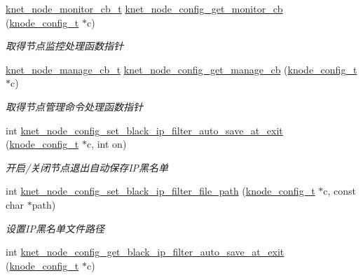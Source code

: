 \begin{DoxyCompactItemize}
\hyperlink{a00066_aabd13837697aceb20b2a2cb8908e79cd_aabd13837697aceb20b2a2cb8908e79cd}{knet\+\_\+node\+\_\+monitor\+\_\+cb\+\_\+t} \hyperlink{a00104_a95c9de27cbf0b374451dba2db035b9df_a95c9de27cbf0b374451dba2db035b9df}{knet\+\_\+node\+\_\+config\+\_\+get\+\_\+monitor\+\_\+cb} (\hyperlink{a00066_af1cfaee0eb1c76ebf06076b95cc47ee1_af1cfaee0eb1c76ebf06076b95cc47ee1}{knode\+\_\+config\+\_\+t} $\ast$c)
\begin{DoxyCompactList}\small\item\em 取得节点监控处理函数指针 \end{DoxyCompactList}\item 
\hyperlink{a00066_acd4bad75f444cb56dffa5f9413bbe456_acd4bad75f444cb56dffa5f9413bbe456}{knet\+\_\+node\+\_\+manage\+\_\+cb\+\_\+t} \hyperlink{a00104_a359b8c65262dd5f33717c59b895fdf05_a359b8c65262dd5f33717c59b895fdf05}{knet\+\_\+node\+\_\+config\+\_\+get\+\_\+manage\+\_\+cb} (\hyperlink{a00066_af1cfaee0eb1c76ebf06076b95cc47ee1_af1cfaee0eb1c76ebf06076b95cc47ee1}{knode\+\_\+config\+\_\+t} $\ast$c)
\begin{DoxyCompactList}\small\item\em 取得节点管理命令处理函数指针 \end{DoxyCompactList}\item 
int \hyperlink{a00104_ae0b28ed1a50ca87b7d74aa8a3f6e2245_ae0b28ed1a50ca87b7d74aa8a3f6e2245}{knet\+\_\+node\+\_\+config\+\_\+set\+\_\+black\+\_\+ip\+\_\+filter\+\_\+auto\+\_\+save\+\_\+at\+\_\+exit} (\hyperlink{a00066_af1cfaee0eb1c76ebf06076b95cc47ee1_af1cfaee0eb1c76ebf06076b95cc47ee1}{knode\+\_\+config\+\_\+t} $\ast$c, int on)
\begin{DoxyCompactList}\small\item\em 开启/关闭节点退出自动保存\+I\+P黑名单 \end{DoxyCompactList}\item 
int \hyperlink{a00104_a02d16d9dda1d4dbc851f474be0e5e095_a02d16d9dda1d4dbc851f474be0e5e095}{knet\+\_\+node\+\_\+config\+\_\+set\+\_\+black\+\_\+ip\+\_\+filter\+\_\+file\+\_\+path} (\hyperlink{a00066_af1cfaee0eb1c76ebf06076b95cc47ee1_af1cfaee0eb1c76ebf06076b95cc47ee1}{knode\+\_\+config\+\_\+t} $\ast$c, const char $\ast$path)
\begin{DoxyCompactList}\small\item\em 设置\+I\+P黑名单文件路径 \end{DoxyCompactList}\item 
int \hyperlink{a00104_a09597fd719f52f3993a7c818fb561227_a09597fd719f52f3993a7c818fb561227}{knet\+\_\+node\+\_\+config\+\_\+get\+\_\+black\+\_\+ip\+\_\+filter\+\_\+auto\+\_\+save\+\_\+at\+\_\+exit} (\hyperlink{a00066_af1cfaee0eb1c76ebf06076b95cc47ee1_af1cfaee0eb1c76ebf06076b95cc47ee1}{knode\+\_\+config\+\_\+t} $\ast$c)

\end{DoxyCompactItemize}
